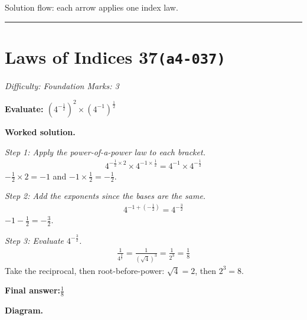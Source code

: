 \documentclass[11pt]{article}
\newcommand{\question}[1]{\par\medskip\noindent\textbf{#1}\par}
\begin{document}
\begin{center}
\end{center}
\small Solution flow: each arrow applies one index law.\normalsize

\medskip\hrule

\section*{Laws of Indices 37\quad\small\texttt{(a4-037)}}
\textit{Difficulty: Foundation \quad\textbar\quad Marks: 3}

\question{Evaluate: \( (4^{-\frac{1}{2}})^2 \times (4^{-1})^{\frac{1}{2}} \)}

\textbf{Worked solution.}

\textit{Step 1: Apply the power-of-a-power law to each bracket.}
\[\begin{gathered}
4^{-\frac{1}{2} \times 2} \times 4^{-1 \times \frac{1}{2}} = 4^{-1} \times 4^{-\frac{1}{2}}
\end{gathered}\]
\( -\frac{1}{2} \times 2 = -1 \) and \( -1 \times \frac{1}{2} = -\frac{1}{2} \).

\textit{Step 2: Add the exponents since the bases are the same.}
\[\begin{gathered}
4^{-1 + (-\frac{1}{2})} = 4^{-\frac{3}{2}}
\end{gathered}\]
\( -1 - \frac{1}{2} = -\frac{3}{2} \).

\textit{Step 3: Evaluate \( 4^{-\frac{3}{2}} \).}
\[\begin{gathered}
\frac{1}{4^{\frac{3}{2}}} = \frac{1}{(\sqrt{4})^3} = \frac{1}{2^3} = \frac{1}{8}
\end{gathered}\]
Take the reciprocal, then root-before-power: \( \sqrt{4} = 2 \), then \( 2^3 = 8 \).

\begin{answerbox}
\textbf{Final answer:}\quad \(\displaystyle \frac{1}{8}\)
\end{answerbox}
\textbf{Diagram.}
\end{document}
